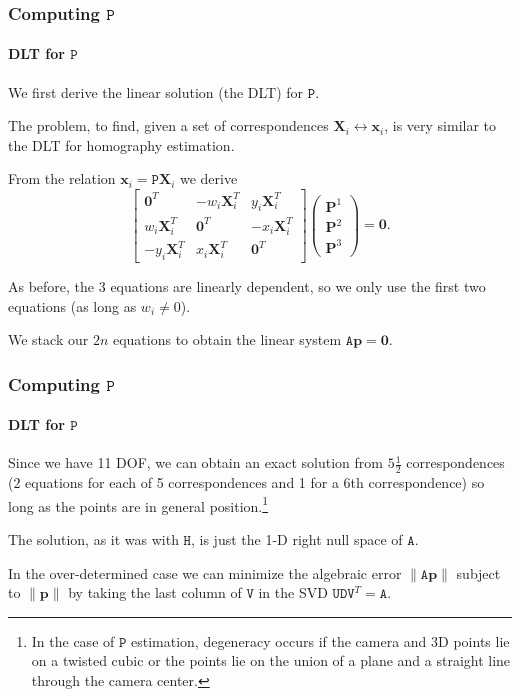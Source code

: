 \documentclass[aspectratio=169]{beamer}
\renewcommand{\vec}[1]{\boldsymbol{#1}}
\newcommand{\mat}[1]{\mathtt{#1}}
\begin{document}
\begin{frame}
\frametitle{Computing $\mat{P}$}
\framesubtitle{DLT for $\mat{P}$}

We first derive the \alert{linear solution} (the DLT) for $\mat{P}$.

\medskip

The problem, to find, given a set of correspondences $\vec{X}_i
\leftrightarrow \vec{x}_i$, is very similar to the DLT for
\alert{homography estimation}.

\medskip

From the relation $\vec{x}_i = \mat{P}\vec{X}_i$ we derive
\begin{equation}
\begin{bmatrix}
\vec{0}^T & -w_i\vec{X}_i^T & y_i\vec{X}_i^T \\
w_i\vec{X}_i^T & \vec{0}^T & -x_i\vec{X}_i^T \\
-y_i\vec{X}_i^T & x_i\vec{X}_i^T & \vec{0}^T
\end{bmatrix}
\begin{pmatrix} \vec{P}^1 \\ \vec{P}^2 \\ \vec{P}^3 \end{pmatrix} =
\vec{0}.
\end{equation}

\medskip

As before, the 3 equations are \alert{linearly dependent}, so we only
use the \alert{first two equations} (as long as $w_i\not=0$).

\medskip

We stack our $2n$ equations to obtain the linear system
$\mat{A}\vec{p}=\vec{0}$.

\end{frame}

\begin{frame}
\frametitle{Computing $\mat{P}$}
\framesubtitle{DLT for $\mat{P}$}

Since we have 11 DOF, we can obtain an \alert{exact solution} from
$5\frac{1}{2}$ correspondences (2 equations for each of 5
        correspondences and 1 for a
6th correspondence) so long as the points are in general
position.\footnote{In the case of $\mat{P}$ estimation, degeneracy
occurs if the camera and 3D points lie on a twisted cubic or the
points lie on the union of a plane and a straight line through the
camera center.}

\medskip

The solution, as it was with $\mat{H}$, is just the 1-D right null
space of $\mat{A}$.

\medskip

In the \alert{over-determined} case we can minimize the
\alert{algebraic error} $\|\mat{A}\vec{p}\|$ subject to $\|\vec{p}\|$
by taking the last column of $\mat{V}$ in the SVD
$\mat{U}\mat{D}\mat{V}^T=\mat{A}$.

\end{frame}
\end{document}
